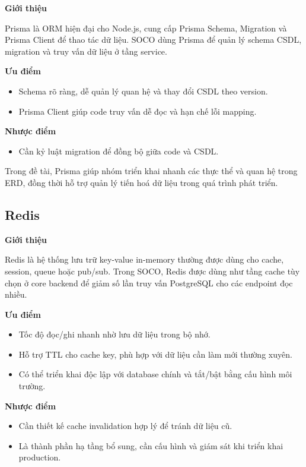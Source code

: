 \textbf{Giới thiệu}

Prisma là ORM hiện đại cho Node.js, cung cấp Prisma Schema, Migration và Prisma Client để thao tác dữ liệu. SOCO dùng Prisma để quản lý schema CSDL, migration và truy vấn dữ liệu ở tầng service.

\textbf{Ưu điểm}
\begin{itemize}
    \item Schema rõ ràng, dễ quản lý quan hệ và thay đổi CSDL theo version.
    \item Prisma Client giúp code truy vấn dễ đọc và hạn chế lỗi mapping.
\end{itemize}

\textbf{Nhược điểm}
\begin{itemize}
    \item Cần kỷ luật migration để đồng bộ giữa code và CSDL.
\end{itemize}

Trong đề tài, Prisma giúp nhóm triển khai nhanh các thực thể và quan hệ trong ERD, đồng thời hỗ trợ quản lý tiến hoá dữ liệu trong quá trình phát triển.

\subsection{Redis}

\textbf{Giới thiệu}

Redis là hệ thống lưu trữ key-value in-memory thường được dùng cho cache, session, queue hoặc pub/sub. Trong SOCO, Redis được dùng như tầng cache tùy chọn ở core backend để giảm số lần truy vấn PostgreSQL cho các endpoint đọc nhiều.

\textbf{Ưu điểm}
\begin{itemize}
    \item Tốc độ đọc/ghi nhanh nhờ lưu dữ liệu trong bộ nhớ.
    \item Hỗ trợ TTL cho cache key, phù hợp với dữ liệu cần làm mới thường xuyên.
    \item Có thể triển khai độc lập với database chính và tắt/bật bằng cấu hình môi trường.
\end{itemize}

\textbf{Nhược điểm}
\begin{itemize}
    \item Cần thiết kế cache invalidation hợp lý để tránh dữ liệu cũ.
    \item Là thành phần hạ tầng bổ sung, cần cấu hình và giám sát khi triển khai production.
\end{itemize}

